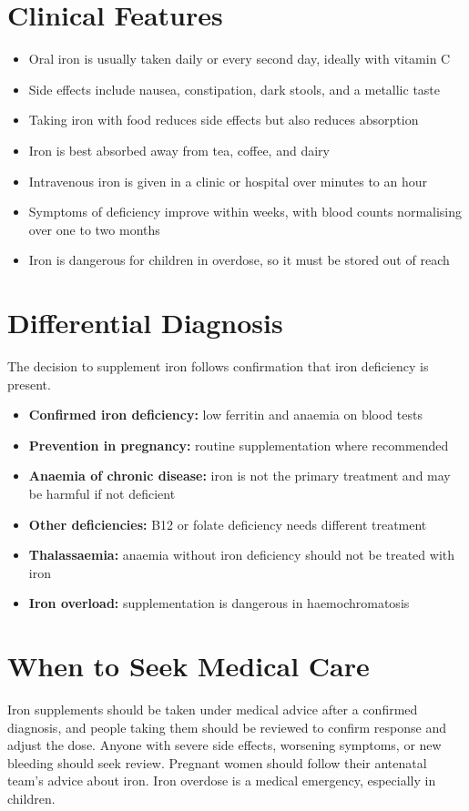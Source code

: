 \section*{Clinical Features}
\begin{itemize}
    \item Oral iron is usually taken daily or every second day, ideally with vitamin C
    \item Side effects include nausea, constipation, dark stools, and a metallic taste
    \item Taking iron with food reduces side effects but also reduces absorption
    \item Iron is best absorbed away from tea, coffee, and dairy
    \item Intravenous iron is given in a clinic or hospital over minutes to an hour
    \item Symptoms of deficiency improve within weeks, with blood counts normalising over one to two months
    \item Iron is dangerous for children in overdose, so it must be stored out of reach
\end{itemize}

\section*{Differential Diagnosis}
The decision to supplement iron follows confirmation that iron deficiency is present.
\begin{itemize}
    \item \textbf{Confirmed iron deficiency:} low ferritin and anaemia on blood tests
    \item \textbf{Prevention in pregnancy:} routine supplementation where recommended
    \item \textbf{Anaemia of chronic disease:} iron is not the primary treatment and may be harmful if not deficient
    \item \textbf{Other deficiencies:} B12 or folate deficiency needs different treatment
    \item \textbf{Thalassaemia:} anaemia without iron deficiency should not be treated with iron
    \item \textbf{Iron overload:} supplementation is dangerous in haemochromatosis
\end{itemize}

\section*{When to Seek Medical Care}
Iron supplements should be taken under medical advice after a confirmed diagnosis, and people taking them should be reviewed to confirm response and adjust the dose. Anyone with severe side effects, worsening symptoms, or new bleeding should seek review. Pregnant women should follow their antenatal team's advice about iron. Iron overdose is a medical emergency, especially in children.

